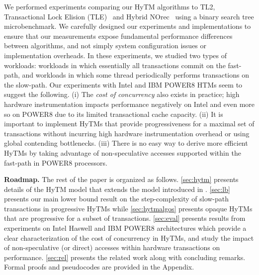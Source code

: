 We performed experiments comparing our HyTM algorithms to TL2, Transactional Lock Elision (TLE)~\cite{tle} and Hybrid NOrec~\cite{hynorecriegel} 
using a binary search tree microbenchmark.
We carefully designed our experiments and implementations to ensure that our measurements expose fundamental performance differences between algorithms, and not simply system configuration issues or implementation overheads.
In these experiments, we studied two types of workloads: workloads in which essentially all transactions commit on the fast-path, 
and workloads in which some thread periodically performs transactions on the slow-path.
Our experiments with Intel and IBM POWER8 HTMs seem to suggest the following.
(i) The \emph{cost of concurrency} also exists in practice; high hardware instrumentation impacts performance negatively on Intel and even more so on POWER8 due to its limited transactional cache capacity.
(ii) It is important to implement HyTMs that provide progressiveness for a maximal set of transactions without incurring high hardware instrumentation overhead or using global contending bottlenecks.
(iii) There is no easy way to derive more efficient HyTMs by taking advantage of non-speculative accesses supported within the fast-path in POWER8 processors. %

\vspace{1mm}\noindent\textbf{Roadmap.}
The rest of the paper is organized as follows.
\cref{sec:hytm} presents details of the HyTM model that extends the model introduced in \cite{hytm14disc}.
\cref{sec:lb} presents our main lower bound result on the step-complexity of slow-path transactions in progressive HyTMs
while \cref{sec:hytmalgos} presents opaque HyTMs that are progressive for a subset of transactions.
\cref{sec:eval} presents results from experiments on Intel Haswell and IBM POWER8 architectures which provide a clear characterization of the cost
of concurrency in HyTMs, and study the impact of %
non-speculative (or direct) accesses within hardware transactions on performance.
\cref{sec:rel} presents the related work along with concluding remarks. Formal proofs and pseudocodes are provided in the Appendix.
%